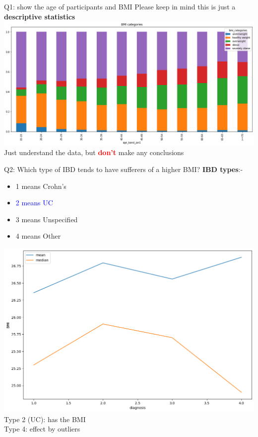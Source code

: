 \documentclass[8pt]{beamer}
\begin{document}
        \begin{frame}{Q1: show the age of participants and BMI}
            Please keep in mind this is just a \textbf{descriptive statistics}
            \centering
            \includegraphics[width=.9\textwidth]{images/age-bmi.png}\\
            Just understand the data, but \textbf{\textcolor{red}{don't}} make any conclusions
        \end{frame}

        \begin{frame}{Q2: Which type of IBD tends to have sufferers of a higher BMI?}
            \textbf{IBD types}:-
            \begin{itemize}
                \item 1 means Crohn's
                \item \textcolor{blue}{2 means UC}
                \item 3 means Unspecified
                \item 4 means Other
            \end{itemize}
            \begin{center}
                \includegraphics[height=.55\textheight]{images/BMI-IBD.png}\\
                Type 2 (UC): has the BMI\\
                Type 4: effect by outliers
            \end{center}
        \end{frame}
\end{document}

